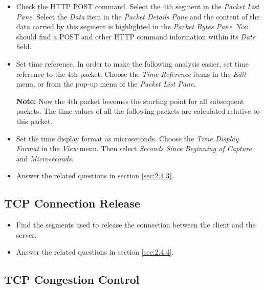 \begin{itemize}
\item Check the HTTP POST command. Select the 4th segment in the {\em
    Packet List Pane}. Select the {\em Data} item in the {\em Packet
    Details Pane} and the content of the data carried by this segment
  is highlighted in the {\em Packet Bytes Pane}. You should find a
  POST and other HTTP command information within its {\em Date} field.

\item Set time reference. In order to make the following analysis
  easier, set time reference to the 4th packet. Choose the {\em Time
    Reference} items in the {\em Edit} menu, or from the pop-up menu
  of the {\em Packet List Pane}.

  {\bf Note:} Now the 4th packet becomes the starting point for all
  subsequent packets. The time values of all the following packets are
  calculated relative to this packet.

\item Set the time display format as microseconds. Choose the {\em
    Time Display Format} in the {\em View} menu. Then select {\em
    Seconds Since Beginning of Capture} and {\em Microseconds}.

\item Answer the related questions in section \ref{sec:2.4.3}.
\end{itemize}

\subsection{TCP Connection Release}

\begin{itemize}
\item Find the segments used to release the connection between the 
client and the server.
\item Answer the related questions in section \ref{sec:2.4.4}.
\end{itemize}



\subsection{TCP Congestion Control}\label{sec:3.3.1}

